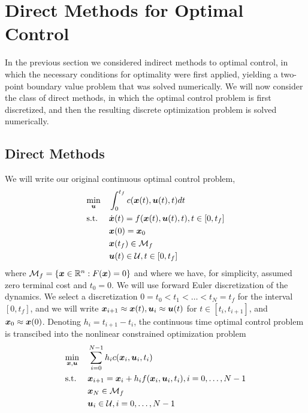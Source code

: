 \section{Direct Methods for Optimal Control}

In the previous section we considered indirect methods to optimal control, in which the necessary conditions for optimality were first applied, yielding a two-point boundary value problem that was solved numerically. We will now consider the class of direct methods, in which the optimal control problem is first discretized, and then the resulting discrete optimization problem is solved numerically. 

\subsection{Direct Methods}

We will write our original continuous optimal control problem,
\begin{equation}
\begin{aligned}
\label{eq:ocp}
& \underset{\bm{u}}{\min} & & \int_0^{t_f} c(\bm{x}(t),\bm{u}(t),t) dt \\
& \textrm{s.t.} & & \dot{\bm{x}}(t) = f(\bm{x}(t), \bm{u}(t),t), t \in [0, t_f]\\
& & & \bm{x}(0) = \bm{x}_0\\
& & & \bm{x}(t_f) \in \mathcal{M}_f\\
& & & \bm{u}(t) \in \mathcal{U}, t\in [0,t_f]
\end{aligned}
\end{equation}
where $\mathcal{M}_f = \{\bm{x}\in \mathbb{R}^n : F(\bm{x}) = 0\}$ and where we have, for simplicity, assumed zero terminal cost and $t_0 = 0$. We will use forward Euler discretization of the dynamics. We select a discretization $0 = t_0 < t_1 < \ldots < t_N = t_f$ for the interval $[0,t_f]$, and we will write $\bm{x}_{i+1} \approx \bm{x}(t), \bm{u}_i \approx \bm{u}(t)$ for $t \in [t_i, t_{i+1}]$, and $\bm{x}_0 \approx \bm{x}(0)$. Denoting $h_i = t_{i+1} - t_i$, the continuous time optimal control problem is transcibed into the nonlinear constrained optimization problem 
\begin{equation}
\begin{aligned}
\label{eq:nlop}
& \underset{\bm{x},\bm{u}}{\min} & & \sum_{i=0}^{N-1} h_i c(\bm{x}_i,\bm{u}_i,t_i) \\
& \textrm{s.t.} & & \bm{x}_{i+1} = \bm{x}_i + h_i f(\bm{x}_i,\bm{u}_i,t_i), i = 0, \ldots, N-1\\
& & & \bm{x}_N \in \mathcal{M}_f\\
& & & \bm{u}_i \in \mathcal{U}, i = 0, \ldots, N-1
\end{aligned}
\end{equation}

